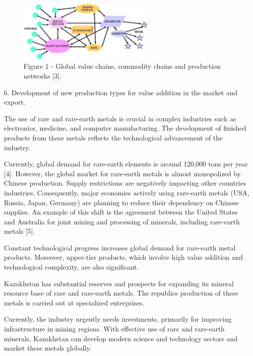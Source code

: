 \begin{figure}[H]
	\centering
	\includegraphics[width=0.6\textwidth]{assets/340}
	\caption*{Figure 1 - Global value chains, commodity chains and production networks {[}3{]}.}
\end{figure}

\begin{multicols}{2}
6. Development of new production types for value addition in the market
and export.

The use of rare and rare-earth metals is crucial in complex industries
such as electronics, medicine, and computer manufacturing. The
development of finished products from these metals reflects the
technological advancement of the industry.

Currently, global demand for rare-earth elements is around 120,000 tons
per year {[}4{]}. However, the global market for rare-earth metals is
almost monopolized by Chinese production. Supply restrictions are
negatively impacting other countries\textquotesingle{} industries.
Consequently, major economies actively using rare-earth metals (USA,
Russia, Japan, Germany) are planning to reduce their dependency on
Chinese supplies. An example of this shift is the agreement between the
United States and Australia for joint mining and processing of minerals,
including rare-earth metals {[}5{]}.

Constant technological progress increases global demand for rare-earth
metal products. Moreover, upper-tier products, which involve high value
addition and technological complexity, are also significant.

Kazakhstan has substantial reserves and prospects for expanding its
mineral resource base of rare and rare-earth metals. The
republic\textquotesingle s production of these metals is carried out at
specialized enterprises.

Currently, the industry urgently needs investments, primarily for
improving infrastructure in mining regions. With effective use of rare
and rare-earth minerals, Kazakhstan can develop modern science and
technology sectors and market these metals globally.


\end{multicols}
